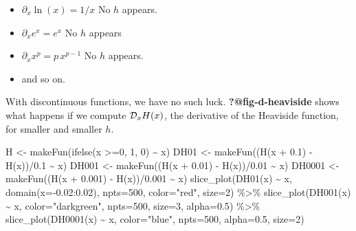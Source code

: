 \documentclass[
  letterpaper,
  DIV=11,
  numbers=noendperiod,
  oneside]{scrreprt}
\newenvironment{Shaded}{\begin{snugshade}}{\end{snugshade}}
\newcommand{\AttributeTok}[1]{\textcolor[rgb]{0.40,0.46,0.14}{#1}}
\newcommand{\DecValTok}[1]{\textcolor[rgb]{0.68,0.00,0.00}{#1}}
\newcommand{\FloatTok}[1]{\textcolor[rgb]{0.68,0.00,0.00}{#1}}
\newcommand{\FunctionTok}[1]{\textcolor[rgb]{0.28,0.35,0.67}{#1}}
\newcommand{\NormalTok}[1]{\textcolor[rgb]{0.00,0.46,0.62}{#1}}
\newcommand{\OtherTok}[1]{\textcolor[rgb]{0.00,0.46,0.62}{#1}}
\newcommand{\SpecialCharTok}[1]{\textcolor[rgb]{0.37,0.37,0.37}{#1}}
\newcommand{\StringTok}[1]{\textcolor[rgb]{0.13,0.47,0.30}{#1}}
\providecommand{\tightlist}{%
  \setlength{\itemsep}{0pt}\setlength{\parskip}{0pt}}
\begin{document}
\begin{itemize}
\tightlist
\item
  \(\partial_x \ln(x) = 1/x\) No \(h\) appears.
\item
  \(\partial_x e^x = e^x\) No \(h\) appears
\item
  \(\partial_x x^p = p\, x^{p-1}\) No \(h\) appears.
\item
  and so on.
\end{itemize}

With discontinuous functions, we have no such luck.
\textbf{?@fig-d-heaviside} shows what happens if we compute
\({\cal D}_x H(x)\), the derivative of the Heaviside function, for
smaller and smaller \(h\).

\begin{Shaded}
\begin{Highlighting}[]
\NormalTok{H }\OtherTok{\textless{}{-}} \FunctionTok{makeFun}\NormalTok{(}\FunctionTok{ifelse}\NormalTok{(x }\SpecialCharTok{\textgreater{}=}\DecValTok{0}\NormalTok{, }\DecValTok{1}\NormalTok{, }\DecValTok{0}\NormalTok{) }\SpecialCharTok{\textasciitilde{}}\NormalTok{ x)}
\NormalTok{DH01   }\OtherTok{\textless{}{-}} \FunctionTok{makeFun}\NormalTok{((}\FunctionTok{H}\NormalTok{(x }\SpecialCharTok{+} \FloatTok{0.1}\NormalTok{) }\SpecialCharTok{{-}} \FunctionTok{H}\NormalTok{(x))}\SpecialCharTok{/}\FloatTok{0.1} \SpecialCharTok{\textasciitilde{}}\NormalTok{ x)}
\NormalTok{DH001  }\OtherTok{\textless{}{-}} \FunctionTok{makeFun}\NormalTok{((}\FunctionTok{H}\NormalTok{(x }\SpecialCharTok{+} \FloatTok{0.01}\NormalTok{) }\SpecialCharTok{{-}} \FunctionTok{H}\NormalTok{(x))}\SpecialCharTok{/}\FloatTok{0.01} \SpecialCharTok{\textasciitilde{}}\NormalTok{ x)}
\NormalTok{DH0001 }\OtherTok{\textless{}{-}} \FunctionTok{makeFun}\NormalTok{((}\FunctionTok{H}\NormalTok{(x }\SpecialCharTok{+} \FloatTok{0.001}\NormalTok{) }\SpecialCharTok{{-}} \FunctionTok{H}\NormalTok{(x))}\SpecialCharTok{/}\FloatTok{0.001} \SpecialCharTok{\textasciitilde{}}\NormalTok{ x)}
\FunctionTok{slice\_plot}\NormalTok{(}\FunctionTok{DH01}\NormalTok{(x) }\SpecialCharTok{\textasciitilde{}}\NormalTok{ x, }\FunctionTok{domain}\NormalTok{(}\AttributeTok{x=}\SpecialCharTok{{-}}\FloatTok{0.02}\SpecialCharTok{:}\FloatTok{0.02}\NormalTok{),}
           \AttributeTok{npts=}\DecValTok{500}\NormalTok{, }\AttributeTok{color=}\StringTok{"red"}\NormalTok{, }\AttributeTok{size=}\DecValTok{2}\NormalTok{) }\SpecialCharTok{\%\textgreater{}\%}
  \FunctionTok{slice\_plot}\NormalTok{(}\FunctionTok{DH001}\NormalTok{(x) }\SpecialCharTok{\textasciitilde{}}\NormalTok{ x,}
           \AttributeTok{color=}\StringTok{"darkgreen"}\NormalTok{, }\AttributeTok{npts=}\DecValTok{500}\NormalTok{, }\AttributeTok{size=}\DecValTok{3}\NormalTok{, }\AttributeTok{alpha=}\FloatTok{0.5}\NormalTok{) }\SpecialCharTok{\%\textgreater{}\%}
  \FunctionTok{slice\_plot}\NormalTok{(}\FunctionTok{DH0001}\NormalTok{(x) }\SpecialCharTok{\textasciitilde{}}\NormalTok{ x,}
           \AttributeTok{color=}\StringTok{"blue"}\NormalTok{, }\AttributeTok{npts=}\DecValTok{500}\NormalTok{, }\AttributeTok{alpha=}\FloatTok{0.5}\NormalTok{, }\AttributeTok{size=}\DecValTok{2}\NormalTok{) }
\end{Highlighting}
\end{Shaded}
\end{document}
